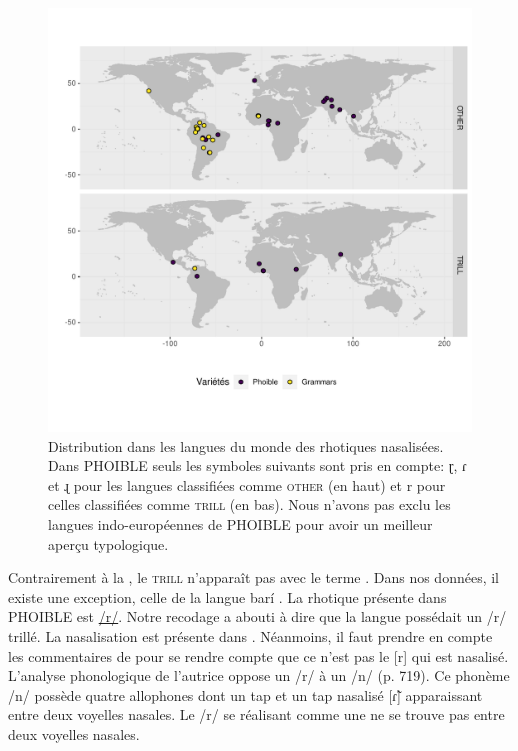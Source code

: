 \begin{figure}
	\centering
	\includegraphics[width=1\linewidth,
	trim={0 1.65cm 0 1.65cm}, clip]{substance/images/rhotiques_nasalization}
	\caption[Distribution dans les langues du monde des rhotiques nasalisées]{Distribution dans les langues du monde des rhotiques nasalisées. Dans PHOIBLE seuls les symboles suivants sont pris en compte: ɽ, ɾ et ɻ pour les langues classifiées comme \textsc{other} (en haut) et r pour celles classifiées comme \textsc{trill} (en bas). Nous n'avons pas exclu les langues indo-européennes de PHOIBLE pour avoir un meilleur aperçu typologique.}
	\label{fig:rhotiquesnasalization}
\end{figure}


Contrairement à la  , le \textsc{trill} n'apparaît pas avec le terme . Dans nos données, il existe une exception, celle de la langue barí . La rhotique présente dans PHOIBLE est \href{https://phoible.org/inventories/view/1892}{/r/}. Notre recodage a abouti à dire que la langue possédait un /r/ trillé. La nasalisation est présente dans \textcite{mogollonperezFonologiaLenguaBari2000}. Néanmoins, il faut prendre en compte les commentaires de \citeauthor{mogollonperezFonologiaLenguaBari2000} pour se rendre compte que ce n'est pas le [r] qui est nasalisé. L'analyse phonologique de l'autrice oppose un /r/ à un /n/ (p. 719). Ce phonème /n/ possède quatre allophones dont un tap et un tap nasalisé [ɾ̃] apparaissant entre deux voyelles nasales. Le /r/ se réalisant comme une  ne se trouve pas entre deux voyelles nasales.\\


